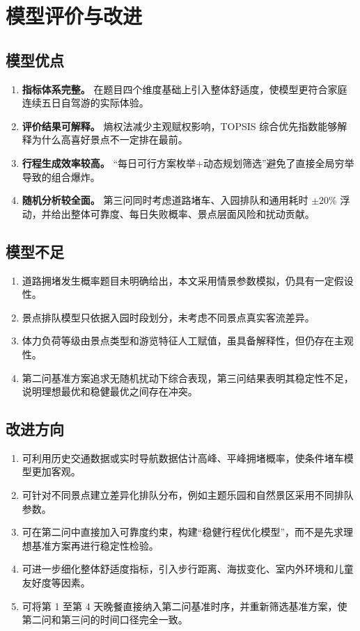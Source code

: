 \documentclass[UTF8,a4paper,12pt]{ctexart}
\begin{document}
\section{模型评价与改进}

\subsection{模型优点}

\begin{enumerate}[label=(\arabic*)]
    \item \textbf{指标体系完整。} 在题目四个维度基础上引入整体舒适度，使模型更符合家庭连续五日自驾游的实际体验。
    \item \textbf{评价结果可解释。} 熵权法减少主观赋权影响，TOPSIS 综合优先指数能够解释为什么高喜好景点不一定排在最前。
    \item \textbf{行程生成效率较高。} “每日可行方案枚举+动态规划筛选”避免了直接全局穷举导致的组合爆炸。
    \item \textbf{随机分析较全面。} 第三问同时考虑道路堵车、入园排队和通用耗时 $\pm20\%$ 浮动，并给出整体可靠度、每日失败概率、景点层面风险和扰动贡献。
\end{enumerate}

\subsection{模型不足}

\begin{enumerate}[label=(\arabic*)]
    \item 道路拥堵发生概率题目未明确给出，本文采用情景参数模拟，仍具有一定假设性。
    \item 景点排队模型只依据入园时段划分，未考虑不同景点真实客流差异。
    \item 体力负荷等级由景点类型和游览特征人工赋值，虽具备解释性，但仍存在主观性。
    \item 第二问基准方案追求无随机扰动下综合表现，第三问结果表明其稳定性不足，说明理想最优和稳健最优之间存在冲突。
\end{enumerate}

\subsection{改进方向}

\begin{enumerate}[label=(\arabic*)]
    \item 可利用历史交通数据或实时导航数据估计高峰、平峰拥堵概率，使条件堵车模型更加客观。
    \item 可针对不同景点建立差异化排队分布，例如主题乐园和自然景区采用不同排队参数。
    \item 可在第二问中直接加入可靠度约束，构建“稳健行程优化模型”，而不是先求理想基准方案再进行稳定性检验。
    \item 可进一步细化整体舒适度指标，引入步行距离、海拔变化、室内外环境和儿童友好度等因素。
    \item 可将第 1 至第 4 天晚餐直接纳入第二问基准时序，并重新筛选基准方案，使第二问和第三问的时间口径完全一致。
\end{enumerate}
\end{document}
